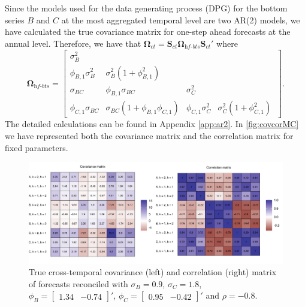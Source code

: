 \documentclass[a4paper,11pt]{article}
\newcommand{\Svet}{\bm{S}}
\newcommand{\Omegavet}{\bm{\Omega}}
\theoremstyle{definition}
\begin{document}
Since the models used for the data generating process (DPG) for the bottom series $B$ and $C$ at the most aggregated temporal level are two AR(2) models, we have calculated the true covariance matrix for one-step ahead forecasts at the annual level. Therefore, we have that $\Omegavet_{ct} = \Svet_{ct}\Omegavet_{\textit{hf-bts}}\Svet_{ct}'$ where
$$
	\Omegavet_{\textit{hf-bts}} = \begin{bmatrix}
		\sigma^2_B            &                                                 &                      &                                        \\
		\phi_{B,1}\sigma_B^2  & \sigma_B^2\left(1+\phi_{B,1}^2\right)           &                      &                                        \\
		\sigma_{BC}           & \phi_{B,1}\sigma_{BC}                           & \sigma_C^2           &                                        \\
		\phi_{C,1}\sigma_{BC} & \sigma_{BC}\left(1+\phi_{B,1}\phi_{C,1} \right) & \phi_{C,1}\sigma_C^2 & \sigma_C^2\left(1+\phi_{C,1}^2\right)\
	\end{bmatrix}.
$$
The detailed calculations can be found in Appendix \ref{app:ar2}.
In \autoref{fig:covcorMC} we have represented both the covariance matrix and the correlation matrix for fixed parameters.

\begin{figure}[!b]
	\centering
	\includegraphics[width = \linewidth]{fig/simAR/covcor.pdf}
	\caption{True cross-temporal covariance (left) and correlation (right) matrix of forecasts reconciled with $\sigma_B = 0.9$, $\sigma_C = 1.8$, $\phi_B =  \begin{bmatrix} 1.34 & -0.74 \end{bmatrix}'$, $\phi_C = \begin{bmatrix} 0.95 & -0.42 \end{bmatrix}'$ and $\rho = -0.8$.}
	\label{fig:covcorMC}
\end{figure}
\end{document}
